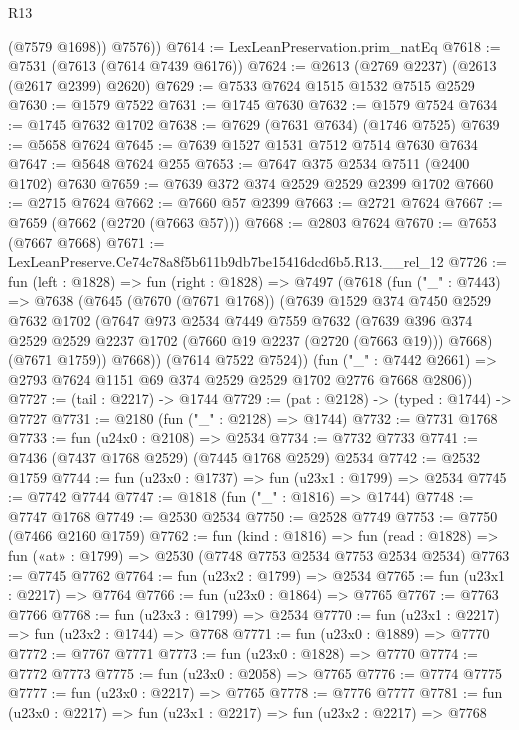 \begin{lexlean}{R13}
\begin{coremodule}
          (@7579 @1698))
        @7576))
@7614 := LexLeanPreservation.prim_natEq
@7618 := @7531 (@7613 (@7614 @7439 @6176))
@7624 := @2613 (@2769 @2237) (@2613 (@2617 @2399) @2620)
@7629 := @7533 @7624 @1515 @1532 @7515 @2529
@7630 := @1579 @7522
@7631 := @1745 @7630
@7632 := @1579 @7524
@7634 := @1745 @7632 @1702
@7638 := @7629 (@7631 @7634) (@1746 @7525)
@7639 := @5658 @7624
@7645 := @7639 @1527 @1531 @7512 @7514 @7630 @7634
@7647 := @5648 @7624 @255
@7653 := @7647 @375 @2534 @7511 (@2400 @1702) @7630
@7659 := @7639 @372 @374 @2529 @2529 @2399 @1702
@7660 := @2715 @7624
@7662 := @7660 @57 @2399
@7663 := @2721 @7624
@7667 := @7659 (@7662 (@2720 (@7663 @57)))
@7668 := @2803 @7624
@7670 := @7653 (@7667 @7668)
@7671 := LexLeanPreserve.Ce74c78a8f5b611b9db7be15416dcd6b5.R13.__rel_12
@7726 := fun (left : @1828) =>
  fun (right : @1828) =>
  @7497
    (@7618
      (fun ("_" : @7443) =>
      @7638
        (@7645
          (@7670 (@7671 @1768))
          (@7639
            @1529
            @374
            @7450
            @2529
            @7632
            @1702
            (@7647
              @973
              @2534
              @7449
              @7559
              @7632
              (@7639 @396 @374 @2529 @2529 @2237 @1702 (@7660 @19 @2237 (@2720 (@7663 @19))) @7668)
              (@7671 @1759))
            @7668))
        (@7614 @7522 @7524))
      (fun ("_" : @7442 @2661) => @2793 @7624 @1151 @69 @374 @2529 @2529 @1702 @2776 @7668 @2806))
@7727 := (tail : @2217) -> @1744
@7729 := (pat : @2128) -> (typed : @1744) -> @7727
@7731 := @2180 (fun ("_" : @2128) => @1744)
@7732 := @7731 @1768
@7733 := fun (u24x0 : @2108) => @2534
@7734 := @7732 @7733
@7741 := @7436 (@7437 @1768 @2529) (@7445 @1768 @2529) @2534
@7742 := @2532 @1759
@7744 := fun (u23x0 : @1737) => fun (u23x1 : @1799) => @2534
@7745 := @7742 @7744
@7747 := @1818 (fun ("_" : @1816) => @1744)
@7748 := @7747 @1768
@7749 := @2530 @2534
@7750 := @2528 @7749
@7753 := @7750 (@7466 @2160 @1759)
@7762 := fun (kind : @1816) =>
  fun (read : @1828) => fun («at» : @1799) => @2530 (@7748 @7753 @2534 @7753 @2534 @2534)
@7763 := @7745 @7762
@7764 := fun (u23x2 : @1799) => @2534
@7765 := fun (u23x1 : @2217) => @7764
@7766 := fun (u23x0 : @1864) => @7765
@7767 := @7763 @7766
@7768 := fun (u23x3 : @1799) => @2534
@7770 := fun (u23x1 : @2217) => fun (u23x2 : @1744) => @7768
@7771 := fun (u23x0 : @1889) => @7770
@7772 := @7767 @7771
@7773 := fun (u23x0 : @1828) => @7770
@7774 := @7772 @7773
@7775 := fun (u23x0 : @2058) => @7765
@7776 := @7774 @7775
@7777 := fun (u23x0 : @2217) => @7765
@7778 := @7776 @7777
@7781 := fun (u23x0 : @2217) => fun (u23x1 : @2217) => fun (u23x2 : @2217) => @7768

\end{coremodule}
\end{lexlean}
